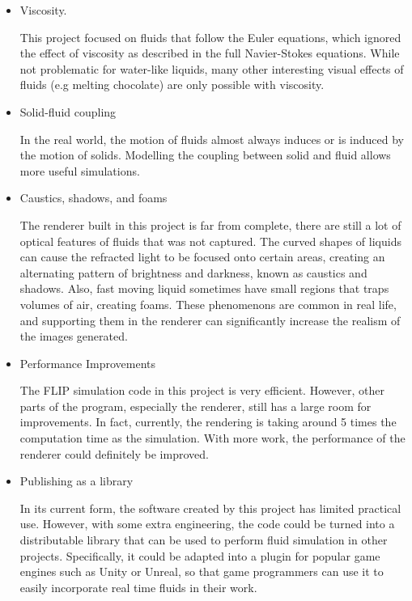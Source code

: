 \begin{itemize}
    \item Viscosity.
    
    This project focused on fluids that follow the Euler equations, which ignored the effect of viscosity as described in the full Navier-Stokes equations. While not problematic for water-like liquids, many other interesting visual effects of fluids (e.g melting chocolate) are only possible with viscosity. 
    

    \item Solid-fluid coupling
    
    In the real world, the motion of fluids almost always induces or is induced by the motion of solids. Modelling the coupling between solid and fluid allows more useful simulations. 

    \item Caustics, shadows, and foams
    
    The renderer built in this project is far from complete, there are still a lot of optical features of fluids that was not captured. The curved shapes of liquids can cause the refracted light to be focused onto certain areas, creating an alternating pattern of brightness and darkness, known as caustics and shadows. Also, fast moving liquid sometimes have small regions that traps volumes of air, creating foams. These phenomenons are common in real life, and supporting them in the renderer can significantly increase the realism of the images generated.

    \item Performance Improvements
    
    The FLIP simulation code in this project is very efficient. However, other parts of the program, especially the renderer, still has a large room for improvements. In fact, currently, the rendering is taking around 5 times the computation time as the simulation. With more work, the performance of the renderer could definitely be improved.


    \item Publishing as a library
    
    In its current form, the software created by this project has limited practical use. However, with some extra engineering, the code could be turned into a distributable library that can be used to perform fluid simulation in other projects. Specifically, it could be adapted into a plugin for popular game engines such as Unity or Unreal, so that game programmers can use it to easily incorporate real time fluids in their work. 
    
\end{itemize}

